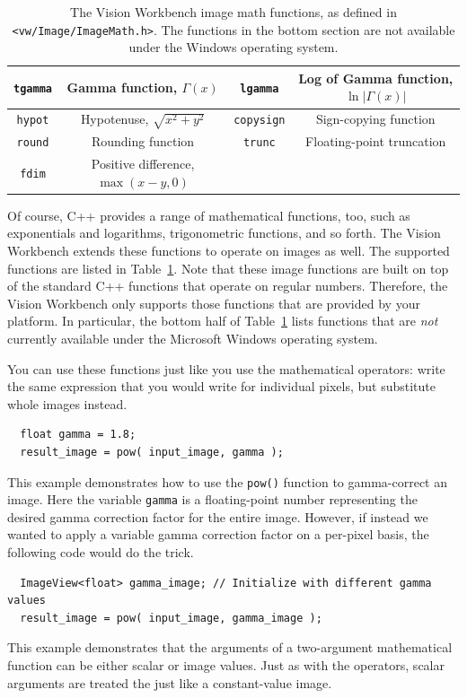 \begin{table}[t]
\begin{centering}
\begin{tabular}{|c|c|c|c|}
\verb#tgamma# & Gamma function, $\Gamma(x)$ & \verb#lgamma# & Log of Gamma function, $\ln |\Gamma(x)|$ \\ \hline
\verb#hypot# & Hypotenuse, $\sqrt{x^2+y^2}$ & \verb#copysign# & Sign-copying function \\ \hline
\verb#round# & Rounding function & \verb#trunc# & Floating-point truncation \\ \hline
\verb#fdim# & Positive difference, $\max(x-y,0)$ & & \\ \hline
\end{tabular}
\caption{The Vision Workbench image math functions, as defined in {\tt <vw/Image/ImageMath.h>}.
The functions in the bottom section are not available under the Windows operating system.}
\label{tbl:math-functions}
\end{centering}\end{table}

Of course, C++ provides a range of mathematical functions, too, such
as exponentials and logarithms, trigonometric functions, and so forth.
The Vision Workbench extends these functions to operate on images as
well.  The supported functions are listed in
Table~\ref{tbl:math-functions}.  Note that these image functions are
built on top of the standard C++ functions that operate on regular
numbers.  Therefore, the Vision Workbench only supports those
functions that are provided by your platform.  In particular, the
bottom half of Table~\ref{tbl:math-functions} lists functions that are
{\it not} currently available under the Microsoft Windows operating
system.

You can use these functions just like you use the mathematical 
operators: write the same expression that you would write for 
individual pixels, but substitute whole images instead.
\begin{verbatim}
  float gamma = 1.8;
  result_image = pow( input_image, gamma );
\end{verbatim}
This example demonstrates how to use the \verb#pow()# function to
gamma-correct an image.  Here the variable \verb#gamma# is a
floating-point number representing the desired gamma correction factor
for the entire image.  However, if instead we wanted to apply a variable
gamma correction factor on a per-pixel basis, the following code would
do the trick.
\begin{verbatim}
  ImageView<float> gamma_image; // Initialize with different gamma values
  result_image = pow( input_image, gamma_image );
\end{verbatim}
This example demonstrates that the arguments of a two-argument
mathematical function can be either scalar or image values.  Just as
with the operators, scalar arguments are treated the just like a
constant-value image.

